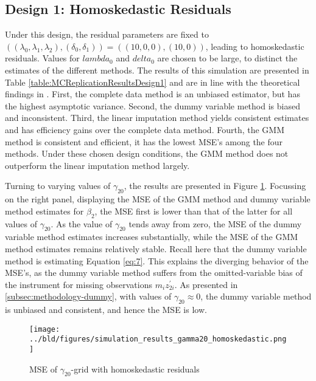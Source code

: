 \subsection{Design 1: Homoskedastic Residuals}
\label{subsec:mc-design1}
Under this design, the residual parameters are fixed to $((\lambda_0, \lambda_1, \lambda_2), (\delta_0, \delta_1)) = ((10, 0, 0), (10, 0))$, leading to homoskedastic residuals.
Values for $lambda_0$ and $delta_0$ are chosen to be large, to distinct the estimates of the different methods.
The results of this simulation are presented in Table \ref{table:MCReplicationResultsDesign1} and are in line with the theoretical findings in \cite{abrevaya2017}.
First, the complete data method is an unbiased estimator, but has the highest asymptotic variance.
Second, the dummy variable method is biased and inconsistent.
Third, the linear imputation method yields consistent estimates and has efficiency gains over the complete data method.
Fourth, the GMM method is consistent and efficient, it has the lowest MSE's among the four methods.
Under these chosen design conditions, the GMM method does not outperform the linear imputation method largely.



Turning to varying values of $\gamma_{20}$, the results are presented in Figure \ref{fig:gamma20_homoskedastic}.
Focussing on the right panel, displaying the MSE of the GMM method and dummy variable method estimates for $\beta_2$, the MSE first is lower than that of the latter for all values of $\gamma_{20}$.
As the value of $\gamma_{20}$ tends away from zero, the MSE of the dummy variable method estimates increases substantially, while the MSE of the GMM method estimates remains relatively stable.
Recall here that the dummy variable method is estimating Equation \eqref{eq:7}.
This explains the diverging behavior of the MSE's, as the dummy variable method suffers from the omitted-variable bias of the instrument for missing observations $m_i z_{2i}^{\prime}$.
As presented in \ref{subsec:methodology-dummy}, with values of $\gamma_{20} \approx 0$, the dummy variable method is unbiased and consistent, and hence the MSE is low.

\begin{figure}[H]
    \centering
    \texttt{[image: ../bld/figures/simulation\_results\_gamma20\_homoskedastic.png]}
    \caption{MSE of $\gamma_{20}$-grid with homoskedastic residuals}
    \label{fig:gamma20_homoskedastic}
\end{figure}

